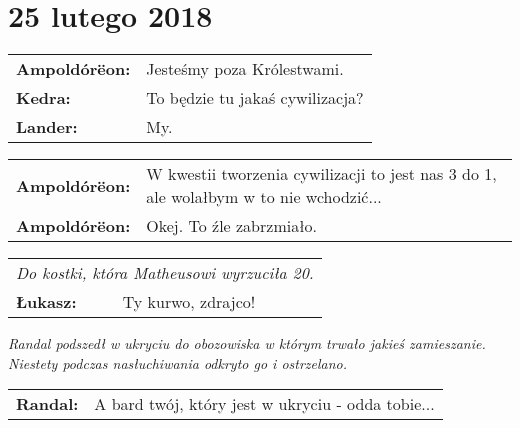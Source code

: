 \documentclass[10pt,twoside,twocolumn]{book}
\begin{document}
\section*{25 lutego 2018}

\begin{rpg-quotebox}{}
   \begin{tabularx}{\columnwidth}{lX}
      \textbf{Ampoldórëon:} &  Jesteśmy poza Królestwami.\\
      \textbf{Kedra:} &  To będzie tu jakaś cywilizacja?\\
      \textbf{Lander:} &  My.\\
   \end{tabularx}
\end{rpg-quotebox}

\begin{rpg-quotebox}{}
   \begin{tabularx}{\columnwidth}{lX}
      \textbf{Ampoldórëon:} &  W kwestii tworzenia cywilizacji to jest nas 3 do 1, ale wolałbym w to nie wchodzić...\\
      \textbf{Ampoldórëon:} &  Okej. To źle zabrzmiało.\\
   \end{tabularx}
\end{rpg-quotebox}

\begin{rpg-quotebox}{}
   \begin{tabularx}{\columnwidth}{lX}
      \multicolumn{2}{l}{\textit{Do kostki, która Matheusowi wyrzuciła 20.}}\\
      \textbf{Łukasz:} &  Ty kurwo, zdrajco!\\
   \end{tabularx}
\end{rpg-quotebox}

\begin{rpg-quotebox}{}
   \textit{Randal podszedł w ukryciu do obozowiska w którym trwało jakieś zamieszanie. Niestety podczas nasłuchiwania odkryto go i ostrzelano.}\\

   \begin{tabularx}{\columnwidth}{lX}
      \textbf{Randal:} &  A bard twój, który jest w ukryciu - odda tobie...\\
   \end{tabularx}
\end{rpg-quotebox}
\end{document}
